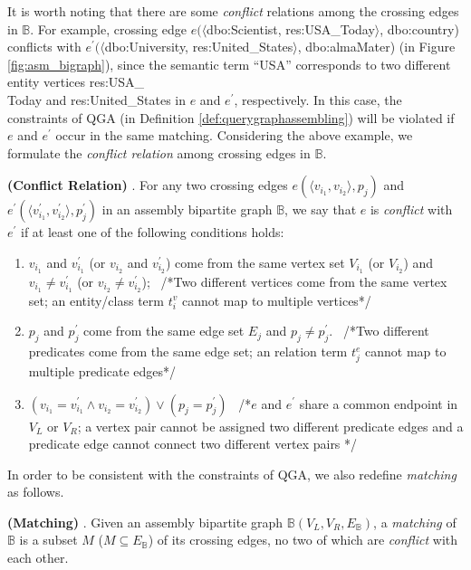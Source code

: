 It is worth noting that there are some \emph{conflict} relations among the crossing edges in $\mathbb{B}$.  For example, crossing edge $e(\langle$dbo:Scientist, res:USA\_Today$\rangle$, dbo:country) conflicts with $e^{\prime}(\langle$dbo:University, res:United\_States$\rangle$, dbo:almaMater) (in Figure \ref{fig:asm_bigraph}), since the semantic term ``USA'' corresponds to two different entity vertices res:USA\_\\Today and res:United\_States in $e$ and $e^{\prime}$, respectively. In this case, the constraints of QGA (in Definition \ref{def:querygraphassembling}) will be violated if $e$ and $e^{\prime}$ occur in the same matching.
Considering the above example, we formulate the \emph{conflict relation} among crossing edges in $\mathbb{B}$. 

\begin{definition} \textbf{ (Conflict Relation) }.\label{def:conflict}	
	For any two crossing edges $e(\langle v_{i_1},v_{i_2}\rangle, p_j)$ and $e^{\prime}(\langle v_{i_1}^{\prime},v_{i_2}^{\prime}\rangle, p_j^{\prime})$ in an assembly bipartite graph $\mathbb{B}$, we say that $e$ is \emph{conflict} with $e^{\prime}$ if at least one of the following conditions holds:
	
	\begin{enumerate}
		\item $v_{i_1}$ and $v_{i_1}^{\prime}$ (or $v_{i_2}$ and $v_{i_2}^{\prime}$) come from the same vertex set $V_{i_1}$ (or $V_{i_2}$) and  $v_{i_1} \neq v_{i_1}^{\prime}$ (or $v_{i_2} \neq v_{i_2}^{\prime}$);		
		\ /*Two different vertices come from the same vertex set; an entity/class term $t_i^{v}$ cannot map to multiple vertices*/
		\item $p_j$ and $p_j^{\prime}$ come from the same edge set $E_j$ and $p_j \neq p_j^{\prime}$.		
		\ /*Two different predicates come from the same edge set; an relation term $t_j^{e}$ cannot map to multiple predicate edges*/
		\item $(v_{i_1}=v_{i_1}^{\prime} \wedge v_{i_2}=v_{i_2}^{\prime}) \vee (p_j = p_j^{\prime})$ 		
		\ /*$e$ and $e^{\prime}$ share a common endpoint in $V_{L}$ or $V_{R}$; a vertex pair cannot be assigned two different predicate edges and a predicate edge cannot connect two different vertex pairs */
	\end{enumerate}
	
	
\end{definition}

In order to be consistent with the constraints of QGA, we also redefine \emph{matching} as follows.
\begin{definition}\textbf{ (Matching) }\label{def:matchingnew}. Given an assembly bipartite graph $\mathbb{B}(V_{L},V_{R},E_{\mathbb{B}})$, a \emph{matching} of $\mathbb{B}$ is a subset $M$ ($M \subseteq E_{\mathbb{B}}$) of its crossing edges, no two of which are \emph{conflict} with each other.
\end{definition}

